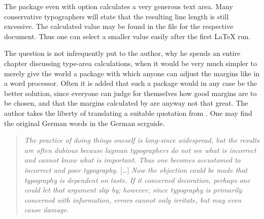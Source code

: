 The  package even with option 
calculates a very generous text area.  Many conservative typographers
will state that the resulting line length is still excessive. The
calculated  value may be found in the  file for the
respective document.  Thus one can select a smaller value easily after
the first {\LaTeX} run.

The question is not infrequently put to the author, why he spends an
entire chapter discussing type-area calculations, when it would be
very much simpler to merely give the world a package with which anyone
can adjust the margins like in a word processor.  Often it is added
that such a package would in any case be the better solution, since
everyone can judge for themselves how good margins are to be chosen,
and that the margins calculated by {\KOMAScript} are anyway not that
great.  The author takes the liberty of translating a suitable
quotation from \cite{TYPO:ErsteHilfe}. One may find the original
German words in the German scrguide.

\begin{quote}
  \label{sec:typearea.tips.cite}%
  \textit{The practice of doing things oneself is long-since
    widespread, but the results are often dubious because layman
    typographers do not see what is incorrect and cannot know what is
    important. Thus one becomes accustomed to incorrect and poor
    typography.} [\dots] \textit{Now the objection could be made that
    typography is dependent on taste. If it concerned decoration,
    perhaps one could let that argument slip by; however, since
    typography is primarily concerned with information, errors cannot
    only irritate, but may even cause damage.}
\end{quote}

